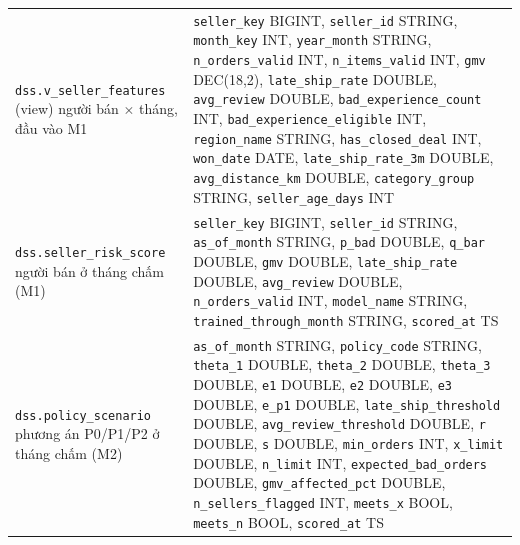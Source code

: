 \documentclass[a4paper]{article}
\begin{document}
{\begin{longtable}{@{}>{\raggedright\arraybackslash}p{3.6cm}>{\raggedright\arraybackslash}p{12.6cm}@{}}
\texttt{dss.v\_\allowbreak{}seller\_\allowbreak{}features} (view) \newline 1 người bán $\times$ tháng, đầu vào M1 & \texttt{seller\_\allowbreak{}key} BIGINT, \texttt{seller\_\allowbreak{}id} STRING, \texttt{month\_\allowbreak{}key} INT, \texttt{year\_\allowbreak{}month} STRING, \texttt{n\_\allowbreak{}orders\_\allowbreak{}valid} INT, \texttt{n\_\allowbreak{}items\_\allowbreak{}valid} INT, \texttt{gmv} DEC(18,2), \texttt{late\_\allowbreak{}ship\_\allowbreak{}rate} DOUBLE, \texttt{avg\_\allowbreak{}review} DOUBLE, \texttt{bad\_\allowbreak{}experience\_\allowbreak{}count} INT, \texttt{bad\_\allowbreak{}experience\_\allowbreak{}eligible} INT, \texttt{region\_\allowbreak{}name} STRING, \texttt{has\_\allowbreak{}closed\_\allowbreak{}deal} INT, \texttt{won\_\allowbreak{}date} DATE, \texttt{late\_\allowbreak{}ship\_\allowbreak{}rate\_\allowbreak{}3m} DOUBLE, \texttt{avg\_\allowbreak{}distance\_\allowbreak{}km} DOUBLE, \texttt{category\_\allowbreak{}group} STRING, \texttt{seller\_\allowbreak{}age\_\allowbreak{}days} INT \\
\addlinespace
\texttt{dss.seller\_\allowbreak{}risk\_\allowbreak{}score} \newline 1 người bán ở tháng chấm (M1) & \texttt{seller\_\allowbreak{}key} BIGINT, \texttt{seller\_\allowbreak{}id} STRING, \texttt{as\_\allowbreak{}of\_\allowbreak{}month} STRING, \texttt{p\_\allowbreak{}bad} DOUBLE, \texttt{q\_\allowbreak{}bar} DOUBLE, \texttt{gmv} DOUBLE, \texttt{late\_\allowbreak{}ship\_\allowbreak{}rate} DOUBLE, \texttt{avg\_\allowbreak{}review} DOUBLE, \texttt{n\_\allowbreak{}orders\_\allowbreak{}valid} INT, \texttt{model\_\allowbreak{}name} STRING, \texttt{trained\_\allowbreak{}through\_\allowbreak{}month} STRING, \texttt{scored\_\allowbreak{}at} TS \\
\addlinespace
\texttt{dss.policy\_\allowbreak{}scenario} \newline 1 phương án P0/P1/P2 ở tháng chấm (M2) & \texttt{as\_\allowbreak{}of\_\allowbreak{}month} STRING, \texttt{policy\_\allowbreak{}code} STRING, \texttt{theta\_\allowbreak{}1} DOUBLE, \texttt{theta\_\allowbreak{}2} DOUBLE, \texttt{theta\_\allowbreak{}3} DOUBLE, \texttt{e1} DOUBLE, \texttt{e2} DOUBLE, \texttt{e3} DOUBLE, \texttt{e\_\allowbreak{}p1} DOUBLE, \texttt{late\_\allowbreak{}ship\_\allowbreak{}threshold} DOUBLE, \texttt{avg\_\allowbreak{}review\_\allowbreak{}threshold} DOUBLE, \texttt{r} DOUBLE, \texttt{s} DOUBLE, \texttt{min\_\allowbreak{}orders} INT, \texttt{x\_\allowbreak{}limit} DOUBLE, \texttt{n\_\allowbreak{}limit} INT, \texttt{expected\_\allowbreak{}bad\_\allowbreak{}orders} DOUBLE, \texttt{gmv\_\allowbreak{}affected\_\allowbreak{}pct} DOUBLE, \texttt{n\_\allowbreak{}sellers\_\allowbreak{}flagged} INT, \texttt{meets\_\allowbreak{}x} BOOL, \texttt{meets\_\allowbreak{}n} BOOL, \texttt{scored\_\allowbreak{}at} TS \\

\end{longtable}}
\end{document}
